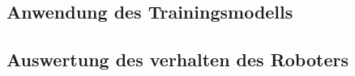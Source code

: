 \documentclass[conference]{IEEEtran}
\begin{document}
\subsection{Anwendung des Trainingsmodells } %
\subsection {Auswertung des verhalten des Roboters}	%

\end{document}
